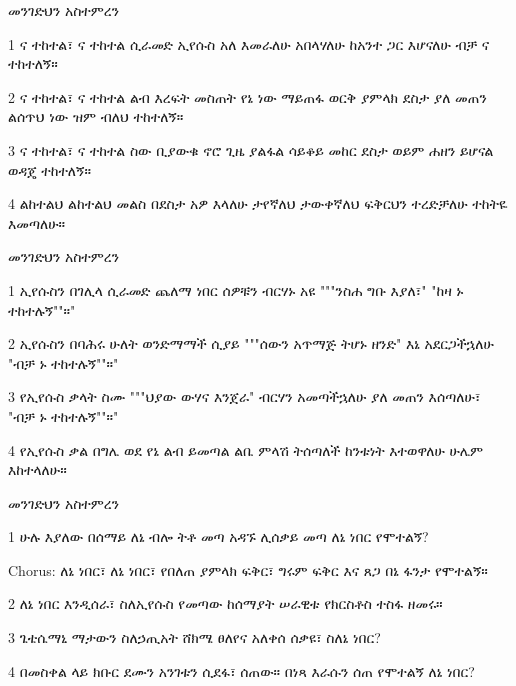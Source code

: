 \documentclass[12pt]{article}
\begin{document}
\begin{hymn}{4}{መንገድህን አስተምረን}
\begin{stanza}
1 ና ተከተል፣ ና ተከተል
ሲራመድ ኢየሱስ አለ
እመራለሁ
አበላሃለሁ
ከአንተ ጋር እሆናለሁ
ብቻ ና ተከተለኝ።
\end{stanza}
\begin{stanza}
2 ና ተከተል፣ ና ተከተል
ልብ እረፍት መስጠት የኔ ነው
ማይጠፋ ወርቅ
ያምላክ ደስታ
ያለ መጠን ልሰጥህ ነው
ዝም ብለህ ተከተለኝ።
\end{stanza}
\begin{stanza}
3 ና ተከተል፣ ና ተከተል
ስው ቢያውቁ ኖሮ
ጊዜ ያልፋል
ሳይቆይ መከር
ደስታ ወይም ሐዘን ይሆናል
ወዳጄ ተከተለኝ።
\end{stanza}
\begin{stanza}
4 ልከተልህ ልከተልህ
መልስ በደስታ አዎ እላለሁ
ታየኛለህ
ታውቀኛለህ
ፍቅርህን ተረድቻለሁ
ተከትዬ እመጣለሁ።
\end{stanza}
\end{hymn}

\begin{hymn}{4}{መንገድህን አስተምረን}
\begin{stanza}
1 ኢየሱስን በገሊላ
ሲራመድ ጨለማ ነበር
ሰዎቹን ብርሃኑ አዩ
"""ንስሐ ግቡ እያለ፣"
"ከዛ ኑ ተከተሉኝ""።"
\end{stanza}
\begin{stanza}
2 ኢየሱስን በባሕሩ
ሁለት ወንድማማች ሲያይ
"""ሰውን አጥማጅ ትሆኑ ዘንድ"
እኔ አደርጋችኋለሁ
"ብቻ ኑ ተከተሉኝ""።"
\end{stanza}
\begin{stanza}
3 የኢየሱስ ቃላት ስሙ
"""ህያው ውሃና እንጀራ"
ብርሃን አመጣችኋለሁ
ያለ መጠን እሰጣለሁ፣
"ብቻ ኑ ተከተሉኝ""።"
\end{stanza}
\begin{stanza}
4 የኢየሱስ ቃል በግሌ
ወደ የኔ ልብ ይመጣል
ልቤ ምላሽ ትሰጣለች
ከንቱነት እተወዋለሁ
ሁሌም እከተላለሁ።
\end{stanza}
\end{hymn}

\begin{hymn}{4}{መንገድህን አስተምረን}
\begin{stanza}
1 ሁሉ እያለው በሰማይ
ለኔ ብሎ ትቶ መጣ
አዳኙ ሊሰቃይ መጣ
ለኔ ነበር የሞተልኝ?
\end{stanza}
\begin{chorus}
Chorus: ለኔ ነበር፣ ለኔ ነበር፣
የበለጠ ያምላክ ፍቅር፣
ግሩም ፍቅር እና ጸጋ
በኔ ፋንታ የሞተልኝ።
\end{chorus}
\begin{stanza}
2 ለኔ ነበር እንዲሰራ፣
ስለኢየሱስ የመጣው
ከሰማያት ሠራዊቱ
የክርስቶስ ተስፋ ዘመሩ።
\end{stanza}
\begin{stanza}
3 ጌቴሴማኒ ማታውን
ስለኃጢአት ሸክሜ
ፀለየና አለቀሰ
ሰቃዩ፣ ስለኔ ነበር?
\end{stanza}
\begin{stanza}
4 በመስቀል ላይ ክቡር ደሙን
አንገቱን ሲደፋ፣ ሰጠው።
በነጻ እራሱን ሰጠ
የሞተልኝ ለኔ ነበር?
\end{stanza}
\end{hymn}
\end{document}
